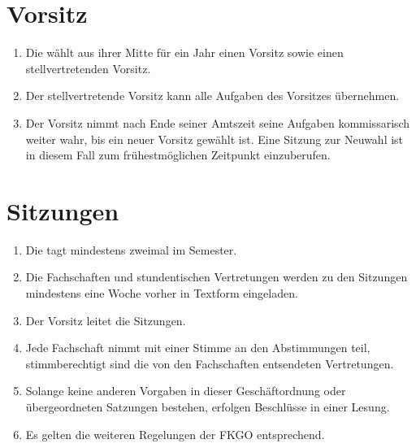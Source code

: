 \documentclass{article}
\begin{document}
	\section{Vorsitz}
	\begin{enumerate}[(1)]
		\setlength\itemsep{0pt}
		\item Die \mnfk wählt aus ihrer Mitte für ein Jahr einen Vorsitz sowie einen stellvertretenden Vorsitz.
		\item Der stellvertretende Vorsitz kann alle Aufgaben des Vorsitzes übernehmen.
		\item Der Vorsitz nimmt nach Ende seiner Amtszeit seine Aufgaben kommissarisch weiter wahr, bis ein neuer Vorsitz gewählt ist.
		Eine Sitzung zur Neuwahl ist in diesem Fall zum frühestmöglichen Zeitpunkt einzuberufen.
	\end{enumerate}
	\section{Sitzungen}
	\begin{enumerate}[(1)]
		\setlength\itemsep{0pt}
		\item Die \mnfk tagt mindestens zweimal im Semester.
		\item Die Fachschaften und stundentischen Vertretungen werden zu den Sitzungen mindestens eine \linebreak[3]Woche vorher in Textform eingeladen.
		\item Der Vorsitz leitet die Sitzungen.
		\item Jede Fachschaft nimmt mit einer Stimme an den Abstimmungen teil, stimmberechtigt sind die von den Fachschaften entsendeten Vertretungen.
		\item Solange keine anderen Vorgaben in dieser Geschäftordnung oder übergeordneten Satzungen bestehen, erfolgen Beschlüsse in einer Lesung.
		\item Es gelten die weiteren Regelungen der FKGO entsprechend.
	\end{enumerate}
\pagebreak
\end{document}
